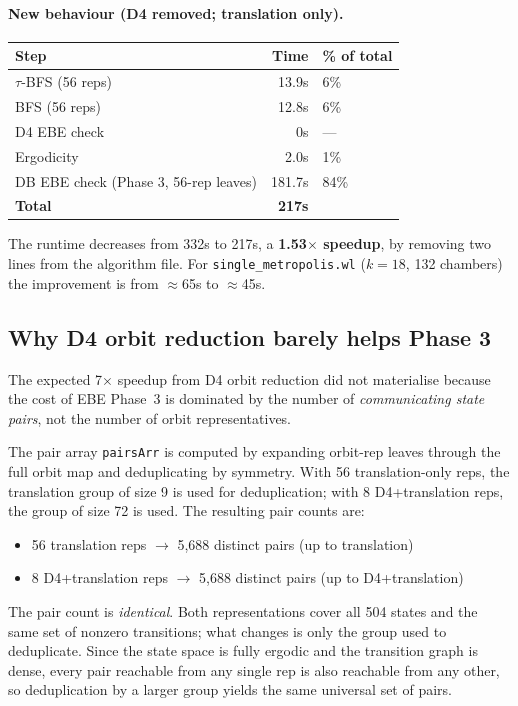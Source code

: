 \documentclass[12pt,a4paper]{article}
\theoremstyle{critical}
\theoremstyle{remark}
\theoremstyle{verified}
\begin{document}
\paragraph{New behaviour (D4 removed; translation only).}
\begin{center}
\begin{tabular}{lrl}
\toprule
\textbf{Step} & \textbf{Time} & \textbf{\% of total} \\
\midrule
$\tau$-BFS (56 reps) & 13.9s & 6\% \\
BFS (56 reps) & 12.8s & 6\% \\
D4 EBE check & 0s & --- \\
Ergodicity & 2.0s & 1\% \\
DB EBE check (Phase 3, 56-rep leaves) & 181.7s & 84\% \\
\midrule
\textbf{Total} & \textbf{217s} & \\
\bottomrule
\end{tabular}
\end{center}

The runtime decreases from 332s to 217s, a \textbf{1.53$\times$ speedup}, by
removing two lines from the algorithm file.  For \texttt{single\_metropolis.wl}
($k=18$, 132 chambers) the improvement is from $\approx$65s to $\approx$45s.

\subsection{Why D4 orbit reduction barely helps Phase 3}

The expected 7$\times$ speedup from D4 orbit reduction did not materialise because
the cost of EBE Phase~3 is dominated by the number of \emph{communicating state
pairs}, not the number of orbit representatives.

The pair array \texttt{pairsArr} is computed by expanding orbit-rep leaves through
the full orbit map and deduplicating by symmetry.  With 56 translation-only reps,
the translation group of size 9 is used for deduplication; with 8 D4+translation
reps, the group of size 72 is used.  The resulting pair counts are:
\begin{itemize}
  \item 56 translation reps $\to$ 5{,}688 distinct pairs (up to translation)
  \item 8 D4+translation reps $\to$ 5{,}688 distinct pairs (up to D4+translation)
\end{itemize}

The pair count is \emph{identical}.  Both representations cover all 504 states
and the same set of nonzero transitions; what changes is only the group used to
deduplicate.  Since the state space is fully ergodic and the transition graph is
dense, every pair reachable from any single rep is also reachable from any other,
so deduplication by a larger group yields the same universal set of pairs.
\end{document}
